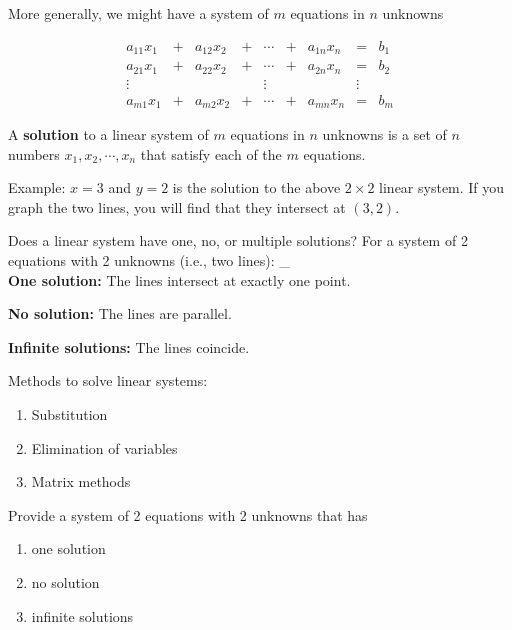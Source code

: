 \documentclass[]{book}
\providecommand{\tightlist}{%
  \setlength{\itemsep}{0pt}\setlength{\parskip}{0pt}}
\theoremstyle{definition}
\theoremstyle{definition}
\theoremstyle{definition}
\theoremstyle{remark}
\let\BeginKnitrBlock\begin \let\EndKnitrBlock\end
\begin{document}
More generally, we might have a system of \(m\) equations in \(n\) unknowns

\[\begin{matrix}
            a_{11}x_1  & + & a_{12}x_2 & + & \cdots & + & a_{1n}x_n & = & b_1\\
            a_{21}x_1  & + & a_{22}x_2 & + & \cdots & + & a_{2n}x_n & = & b_2\\
            \vdots     &   &     &   & \vdots &   &     & \vdots & \\
            a_{m1}x_1  & + & a_{m2}x_2 & + & \cdots & + & a_{mn}x_n & = & b_m
            \end{matrix}\]

A \textbf{solution} to a linear system of \(m\) equations in \(n\) unknowns is a set of \(n\) numbers \(x_1, x_2, \cdots, x_n\) that satisfy each of the \(m\) equations.

Example: \(x=3\) and \(y=2\) is the solution to the above \(2\times 2\) linear system. If you graph the two lines, you will find that they intersect at \((3,2)\).

Does a linear system have one, no, or multiple solutions? For a system of 2 equations with 2 unknowns (i.e., two lines):
\_\\
\textbf{One solution:} The lines intersect at exactly one point.

\textbf{No solution:} The lines are parallel.

\textbf{Infinite solutions:} The lines coincide.

Methods to solve linear systems:

\begin{enumerate}
\def\labelenumi{\arabic{enumi}.}
\tightlist
\item
  Substitution
\item
  Elimination of variables
\item
  Matrix methods
\end{enumerate}

\BeginKnitrBlock{exercise}[Linear Equations]
\protect\hypertarget{exr:lineareq}{}{\label{exr:lineareq} {} }

Provide a system of 2 equations with 2 unknowns that has

\begin{enumerate}
\def\labelenumi{\arabic{enumi}.}
\item
  one solution
\item
  no solution
\item
  infinite solutions
\end{enumerate}
\EndKnitrBlock{exercise}
\end{document}
